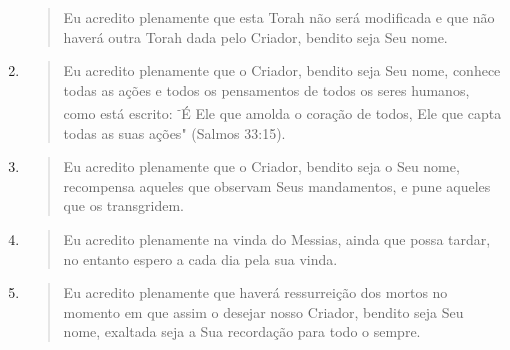 \begin{enumerate}
\begin{quote}
  Eu acredito plenamente que esta Torah não será modificada e que não
  ha­verá outra Torah dada pelo Criador, bendito seja Seu nome.
  \end{quote}
\item
  \begin{quote}
  Eu acredito plenamente que o Criador, bendito seja Seu nome, conhece
  todas as ações e todos os pensamentos de todos os seres humanos, como
  está escrito: \textsuperscript{-}É Ele que amolda o coração de todos,
  Ele que capta todas as suas ações" (Salmos 33:15).
  \end{quote}
\item
  \begin{quote}
  Eu acredito plenamente que o Criador, bendito seja o Seu nome,
  recom­pensa aqueles que observam Seus mandamentos, e pune aqueles que
  os transgridem.
  \end{quote}
\item
  \begin{quote}
  Eu acredito plenamente na vinda do Messias, ainda que possa tardar, no
  entanto espero a cada dia pela sua vinda.
  \end{quote}
\item
  \begin{quote}
  Eu acredito plenamente que haverá ressurreição dos mortos no momento
  em que assim o desejar nosso Criador, bendito seja Seu nome, exaltada
  seja a Sua recordação para todo o sempre.
  \end{quote}
\end{enumerate}

